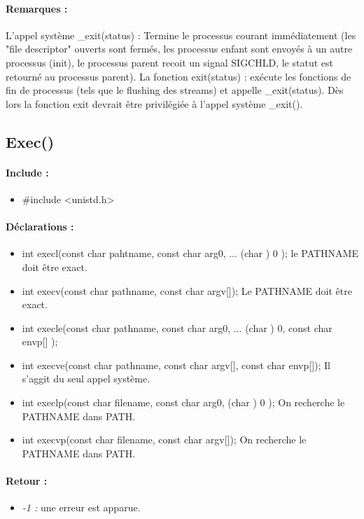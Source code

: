 \documentclass{article}[12pt]
\begin{document}
\paragraph{Remarques : }
L'appel système \_exit(status) : Termine le processus courant immédiatement (les "file descriptor" ouverts sont fermés, les processus enfant sont envoyés à un autre processus (init), le processus parent recoit un signal SIGCHLD, le statut est retourné au processus parent).
La fonction exit(status) : exécute les fonctions de fin de processus (tels que le flushing des streams) et appelle \_exit(status).
Dès lors la fonction exit devrait être privilégiée à l'appel système \_exit().
\subsection{Exec()}
\paragraph{Include : }
\begin{itemize}
	\item \#include <unistd.h>
\end{itemize}
\paragraph{Déclarations : }
\begin{itemize}
	\item int execl(const char \* pahtname, const char \* arg0, ... \/\* (char \*) 0 \*\/ ); le PATHNAME doit être exact.
    \item int execv(const char \* pathname, const char \* argv[]); Le PATHNAME doit être exact. 
    \item int execle(const char \* pathname, const char \* arg0, ... \/\* (char \*) 0, const char \* envp[] \*\/);
    \item int execve(const char \* pathname, const char \* argv[], const char \* envp[]); Il s'aggit du seul appel système.
    \item int execlp(const char \* filename, const char \* arg0, \/\* (char \*) 0 \*\/); On recherche le PATHNAME dans PATH.
    \item int execvp(const char \* filename, const char \* argv[]); On recherche le PATHNAME dans PATH.
\end{itemize}
\paragraph{Retour : }
\begin{itemize}
	\item \emph{-1 : } une erreur est apparue.
\end{itemize}
\end{document}
